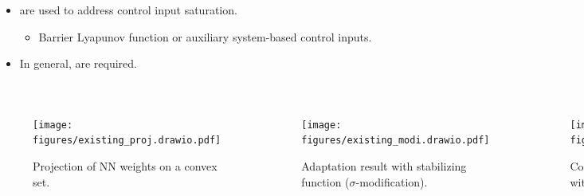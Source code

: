 \documentclass[8pt, aspectratio=169]{beamer}
\newcommand{\ctxt}[2]{\color{#1}{#2}\color{black}}
\begin{document}
\begin{frame}{\insertsubsectionhead}
\begin{enumerate}
\begin{columns}[T]
          {
            \begin{itemize}
              \item \ctxt{airforceblue}{Conventional controllers }are used to address control input saturation. 
                    \begin{itemize}
                      \item Barrier Lyapunov function or auxiliary system-based control inputs.
                    \end{itemize}
              \item In general, \ctxt{awesome}{nominal models }are required.
            \end{itemize}
          }

      \end{columns}

  \end{enumerate}


  \begin{columns}[T]


        {
          \centering
          \begin{figure}
            \texttt{[image: figures/existing\_proj.drawio.pdf]}
            \caption{Projection of NN weights on a convex set.}
          \end{figure}
        }

          
        {
          \centering
          \begin{figure}
            \texttt{[image: figures/existing\_modi.drawio.pdf]}
            \caption{Adaptation result with stabilizing function (\eg $\sigma$-modification).}
          \end{figure}
        }
      
      
        {
          \centering
          \begin{figure}
            \texttt{[image: figures/existing\_conv.drawio.pdf]}
            \caption{Control input saturation handling with additional control inputs.}
          \end{figure}
        }

    \end{columns}

\end{frame}
\end{document}
